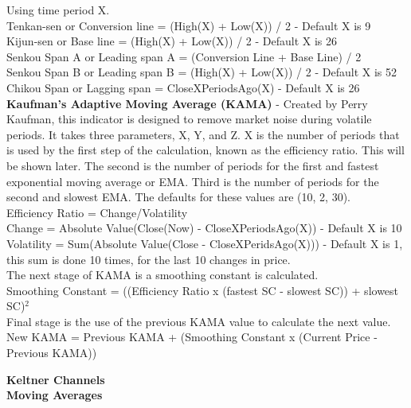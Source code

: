 \documentclass[12pt,a4paper]{article}
\begin{document}
Using time period X.\\
Tenkan-sen or Conversion line = (High(X) + Low(X)) / 2  - Default X is 9 \\
Kijun-sen or Base line = (High(X) + Low(X)) / 2 - Default X is 26 \\
Senkou Span A or Leading span A = (Conversion Line + Base Line) / 2 \\
Senkou Span B or Leading span B = (High(X) + Low(X)) / 2 - Default X is 52 \\
Chikou Span or Lagging span = CloseXPeriodsAgo(X) - Default X is 26\\

\iffalse
[]
\fi

\textbf{Kaufman's Adaptive Moving Average (KAMA)} - Created by Perry Kaufman, this indicator is designed to remove market noise during volatile periods. It takes three parameters, X, Y, and Z. X is the number of periods that is used by the first step of the calculation, known as the efficiency ratio. This will be shown later. The second is the number of periods for the first and fastest exponential moving average or EMA. Third is the number of periods for the second and slowest EMA. The defaults for these values are (10, 2, 30). \\

Efficiency Ratio = Change/Volatility\\
Change = Absolute Value(Close(Now) - CloseXPeriodsAgo(X)) - Default X is 10 \\
Volatility = Sum(Absolute Value(Close - CloseXPeridsAgo(X))) - Default X is 1, this sum is done 10 times, for the last 10 changes in price.\\

The next stage of KAMA is a smoothing constant is calculated. \\

Smoothing Constant = ((Efficiency Ratio x (fastest SC - slowest SC)) + slowest SC)$^2$\\

Final stage is the use of the previous KAMA value to calculate the next value. \\

New KAMA = Previous KAMA + (Smoothing Constant x (Current Price - Previous KAMA))

\iffalse
[]
\fi

\textbf{Keltner Channels} \\

\iffalse
[]
\fi

\textbf{Moving Averages} \\
\end{document}
